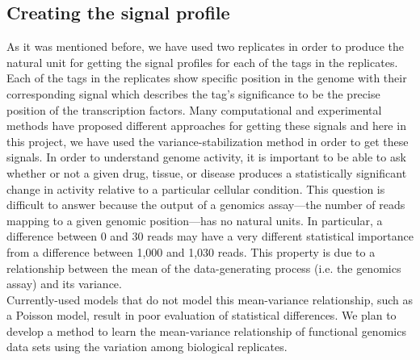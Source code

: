 \documentclass[11pt,letterpaper]{article}
\begin{document}
\subsection{Creating the signal profile}
As it was mentioned before, we have used two replicates in order to produce the natural unit for getting the signal profiles for each of the tags in the replicates.
Each of the tags in the replicates show specific position in the genome with their corresponding signal which describes the tag's significance to be the precise position of the transcription factors.
Many computational and experimental methods have proposed different approaches for getting these signals and here in this project, we have used the variance-stabilization method in order to get these signals.
In order to understand genome activity, it is important to be able to ask whether or not a given drug, tissue, or disease produces a statistically significant change in activity relative to a particular cellular condition. This question is difficult to answer because the output of a genomics assay---the number of reads mapping to a given genomic position---has no natural units. In particular, a difference between 0 and 30 reads may have a very different statistical importance from a difference between 1,000 and 1,030 reads. This property is due to a relationship between the mean of the data-generating process (i.e. the genomics assay) and its variance.\\ Currently-used models that do not model this mean-variance relationship, such as a Poisson model, result in poor evaluation of statistical differences. We plan to develop a method to learn the mean-variance relationship of functional genomics data sets using the variation among biological replicates.\\
\end{document}
